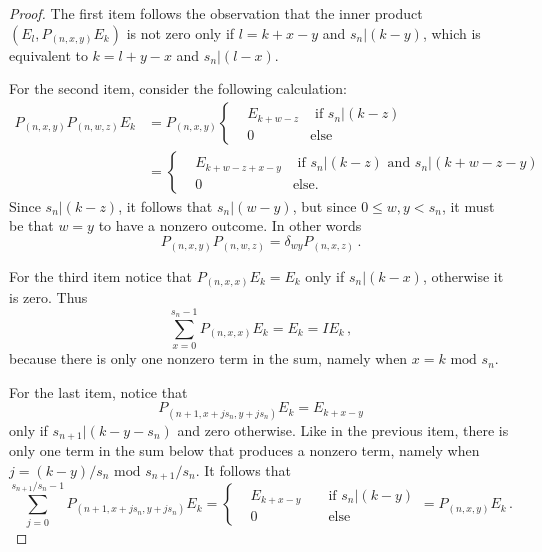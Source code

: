 \documentclass[12pt,reqno]{amsart}
\numberwithin{equation}{section}
\begin{document}
\begin{proof}
The first item follows the observation that the inner product $(E_l,P_{(n,x,y)}E_k)$ is not zero only if $l=k+x-y$ and 
$s_n|(k-y)$, which is equivalent to $k=l+y-x$ and $s_n|(l-x)$.

For the second item, consider the following calculation:
\begin{equation*}
\begin{aligned}
P_{(n,x,y)}P_{(n,w,z)}E_k &= P_{(n,x,y)}\left\{
\begin{aligned}
& E_{k+w-z}  &\textrm{ if }s_n|(k-z)\\
&0 &\textrm{else} 
\end{aligned}\right. \\
&= \left\{
\begin{aligned}
& E_{k+w-z+x-y}  &\textrm{ if }s_n|(k-z)\textrm{ and }s_n|(k+w-z-y)\\
&0 &\textrm{else.} 
\end{aligned}\right.
\end{aligned}
\end{equation*}
Since $s_n|(k-z)$, it follows that $s_n|(w-y)$, but since $0\le w,y<s_n$, it must be that $w=y$ to have a nonzero outcome.  In other words
\begin{equation*}
P_{(n,x,y)}P_{(n,w,z)} = \delta_{wy}P_{(n,x,z)}\,.
\end{equation*}

For the third item notice that $P_{(n,x,x)}E_k = E_k$ only if $s_n|(k-x)$, otherwise it is zero.  Thus
\begin{equation*}
\sum_{x=0}^{s_n-1}P_{(n,x,x)}E_k = E_k = IE_k\,,
\end{equation*}
because there is only one nonzero term in the sum, namely when $x = k\textrm{ mod }s_n$.

For the last item, notice that
\begin{equation*}P_{(n+1,x+js_n,y+js_n)}E_k= E_{k+x-y}
\end{equation*}
only if $s_{n+1}|(k-y-s_n)$ and zero otherwise.   Like in the previous item, there is only one term in the sum below that produces a nonzero term, namely when $j=(k-y)/s_n\textrm{ mod }s_{n+1}/s_n$.  It follows that
\begin{equation*}
\sum_{j=0}^{s_{n+1}/s_n-1}P_{(n+1,x+js_n,y+js_n)}E_k=\left\{
\begin{aligned}
& E_{k+x-y} &&\textrm{ if }s_n|(k-y) \\
&0 &&\textrm{ else}
\end{aligned}\right. = P_{(n,x,y)}E_k\,.
\end{equation*}
\end{proof}
\end{document}
